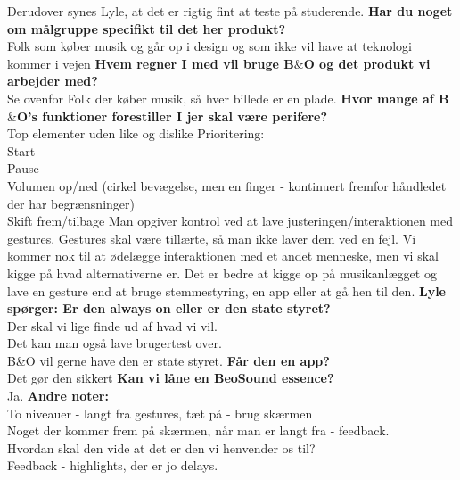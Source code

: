 Derudover synes Lyle, at det er rigtig fint at teste på studerende.\blankline
%  
\textbf{Har du noget om målgruppe specifikt til det her produkt?}\\
Folk som køber musik og går op i design og som ikke vil have at teknologi kommer i vejen\blankline
%
\textbf{Hvem regner I med vil bruge B$\&$O og det produkt vi arbejder med?}\\
Se ovenfor 
Folk der køber musik, så hver billede er en plade. \blankline
%
\textbf{Hvor mange af B$\&$O’s funktioner forestiller I jer skal være perifere?}\\ 
Top elementer uden like og dislike \blankline
%
Prioritering:\\
Start\\
Pause \\
Volumen op/ned (cirkel bevægelse, men en finger - kontinuert fremfor håndledet der har begrænsninger)\\
Skift frem/tilbage\blankline
%
Man opgiver kontrol ved at lave justeringen/interaktionen med gestures. 
Gestures skal være tillærte, så man ikke laver dem ved en fejl. 
Vi kommer nok til at ødelægge interaktionen med et andet menneske, men vi skal kigge på hvad alternativerne er. Det er bedre at kigge op på musikanlægget og lave en gesture end at bruge stemmestyring, en app eller at gå hen til den. \blankline
%
\textbf{Lyle spørger: Er den always on eller er den state styret?}\\
Der skal vi lige finde ud af hvad vi vil. \\
Det kan man også lave brugertest over. \\
B$\&$O vil gerne have den er state styret.\blankline
%
\textbf{Får den en app?}\\
Det gør den sikkert\blankline
%
\textbf{Kan vi låne en BeoSound essence?}\\
Ja.\blankline
%
\textbf{Andre noter:} \\
To niveauer - langt fra gestures, tæt på - brug skærmen \\
Noget der kommer frem på skærmen, når man er langt fra - feedback. \\
Hvordan skal den vide at det er den vi henvender os til? \\
Feedback - highlights, der er jo delays. \\

